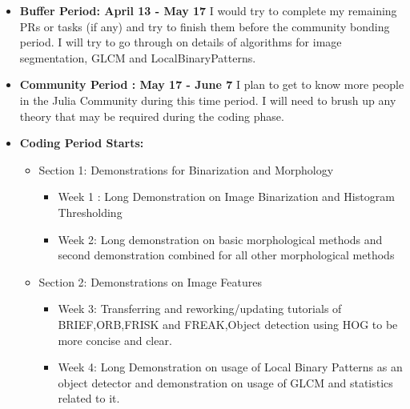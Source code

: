 \large
\begin{itemize}[topsep=0]
  \item \textbf{Buffer Period: April 13 - May 17} I would try to complete my remaining PRs or tasks (if any) and try to finish them before the community bonding period. I will try to go through on details of algorithms for image segmentation, GLCM and LocalBinaryPatterns.
  \item \textbf{Community Period : May 17 - June 7} I plan to get to know more people in the Julia Community during this time period. I will need to brush up any theory that may be required during the coding phase. 
  \item \textbf{Coding Period Starts:}
  \begin{itemize}
      \item \textsf{Section 1: Demonstrations for Binarization and Morphology}
      \begin{itemize}
            \item Week 1 : Long Demonstration on Image Binarization and Histogram Thresholding
            \item Week 2: Long demonstration on basic morphological methods and second demonstration combined for all other morphological methods 
      \end{itemize}
      \item \textsf{Section 2: Demonstrations on Image Features}
      \begin{itemize}
            \item Week 3: Transferring and reworking/updating tutorials of BRIEF,ORB,FRISK and FREAK,Object detection using HOG to be more concise and clear.
             \item Week 4: Long Demonstration on usage of Local Binary Patterns as an object detector and demonstration on usage of GLCM and statistics related to it.
      \end{itemize}


\end{itemize}
\end{itemize}
